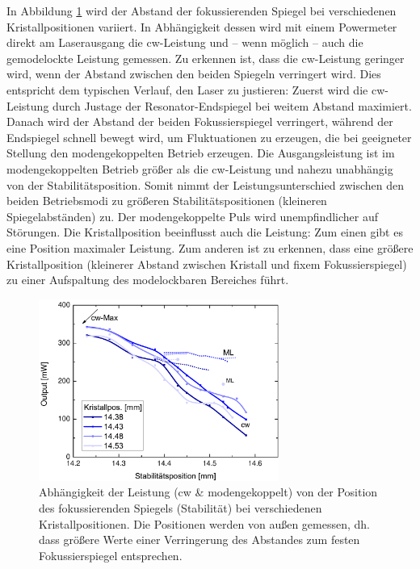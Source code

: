 \documentclass[bachelor,       %
               twoside,        %
               BCOR10mm,       %
               liststotoc,nomtotoc,bibtotoc, %
               english,ngerman, %
               final,          %
               ]{GAUBM}
\begin{document}
In Abbildung \ref{fig:map} wird der Abstand der fokussierenden Spiegel bei verschiedenen Kristallpositionen variiert.
In Abhängigkeit dessen wird mit einem Powermeter direkt am Laserausgang die cw-Leistung und -- wenn möglich -- auch die gemodelockte Leistung gemessen.
Zu erkennen ist, dass die cw-Leistung geringer wird, wenn der Abstand zwischen den beiden Spiegeln verringert wird.
Dies entspricht dem typischen Verlauf, den Laser zu justieren:
Zuerst wird die cw-Leistung durch Justage der Resonator-Endspiegel bei weitem Abstand maximiert.
Danach wird der Abstand der beiden Fokussierspiegel verringert, während der Endspiegel schnell bewegt wird, um Fluktuationen zu erzeugen, die bei geeigneter Stellung den modengekoppelten Betrieb erzeugen.
Die Ausgangsleistung ist im modengekoppelten Betrieb größer als die cw-Leistung und nahezu unabhängig von der Stabilitätsposition.
Somit nimmt der Leistungsunterschied zwischen den beiden Betriebsmodi zu größeren Stabilitätspositionen (kleineren Spiegelabständen) zu.
Der modengekoppelte Puls wird unempfindlicher auf Störungen.
Die Kristallposition beeinflusst auch die Leistung: Zum einen gibt es eine Position maximaler Leistung.
Zum anderen ist zu erkennen, dass eine größere Kristallposition (kleinerer Abstand zwischen Kristall und fixem Fokussierspiegel) zu einer Aufspaltung des modelockbaren Bereiches führt.

\begin{figure}[!htb]
	\centering
	\includegraphics[width=0.7\textwidth]{figures/map.pdf}
	\caption{Abhängigkeit der Leistung (cw \& modengekoppelt) von der Position des fokussierenden Spiegels (Stabilität) bei verschiedenen Kristallpositionen.
	Die Positionen werden von außen gemessen, dh. dass größere Werte einer Verringerung des Abstandes zum festen Fokussierspiegel entsprechen.}
	\label{fig:map}
\end{figure}
\end{document}
